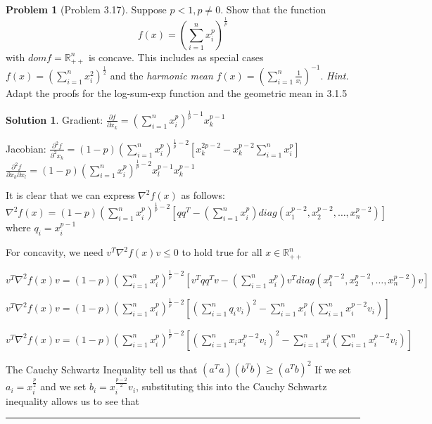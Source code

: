 \documentclass{article}
\theoremstyle{definition}
\newtheorem{problem}{Problem}
\def\fline{\rule{0.75\linewidth}{0.5pt}}
\newcommand{\finishline}{\begin{center}\fline\end{center}}
\newtheorem*{solution*}{Solution}
\newenvironment{solution}{\begin{solution*}}{{\finishline} \end{solution*}}
\begin{document}
\begin{problem} [Problem 3.17]
Suppose $p < 1, p \neq 0$. Show that the function 
\begin{equation}
    f(x) = (\sum_{i=1}^{n} x_i^p)^{\frac{1}{p}}
\end{equation}
with $dom f = \mathbb{R}^n_{++}$ is concave. This includes as special cases $f(x) = (\sum_{i=1}^{n} x_i^2)^{\frac{1}{2}}$ and the \textit{harmonic mean} $f(x) = (\sum_{i=1}^{n} \frac{1}{x_i})^{-1}$. \textit{Hint.} Adapt the proofs for the log-sum-exp
function and the geometric mean in 3.1.5

\begin{solution}
    Gradient: $\frac{\partial{f}}{\partial{x_k}} = (\sum_{i=1}^{n} x_i^p)^{\frac{1}{p} - 1} x_k^{p - 1}$

    Jacobian: \newline 
    $\frac{\partial^2{f}}{\partial^2{x_k}} = (1 - p) (\sum_{i=1}^{n} x_i^p)^{\frac{1}{p} - 2} [x_k^{2p - 2} - x_k^{p - 2} \sum_{i=1}^{n} x_i^p]$ \newline 
    $\frac{\partial^2{f}}{\partial{x_k} \partial{x_l}} = (1 - p) (\sum_{i=1}^{n} x_i^p)^{\frac{1}{p} - 2} x_l^{p - 1} x_k^{p - 1}$ \newline 

    It is clear that we can express $\nabla^2f(x)$ as follows: \newline 
    $\nabla^2f(x) = (1 - p) (\sum_{i=1}^{n} x_i^p)^{\frac{1}{p} - 2} [qq^T - (\sum_{i=1}^{n} x_i^p) diag(x_1^{p - 2}, x_2^{p - 2}, \dots, x_n^{p - 2})]$ where $q_i = x_i^{p - 1}$ \newline 

    For concavity, we need $v^T \nabla^2f(x) v \leq 0$ to hold true for all $x \in \mathbb{R}^n_{++}$

    $v^T \nabla^2f(x) v  = (1 - p) (\sum_{i=1}^{n} x_i^p)^{\frac{1}{p} - 2} [v^Tqq^Tv - (\sum_{i=1}^{n} x_i^p) v^T diag(x_1^{p - 2}, x_2^{p - 2}, \dots, x_n^{p - 2}) v]$ 

    $v^T \nabla^2f(x) v  = (1 - p) (\sum_{i=1}^{n} x_i^p)^{\frac{1}{p} - 2} [(\sum_{i=1}^{n} q_i v_i)^2 - \sum_{i=1}^{n} x_i^p (\sum_{i=1}^{n} x_i^{p - 2} v_i)]$ 

    $v^T \nabla^2f(x) v  = (1 - p) (\sum_{i=1}^{n} x_i^p)^{\frac{1}{p} - 2} [(\sum_{i=1}^{n} x_i x_i^{p - 2} v_i)^2 - \sum_{i=1}^{n} x_i^p (\sum_{i=1}^{n} x_i^{p - 2} v_i)]$ 

    The Cauchy Schwartz Inequality tell us that $(a^Ta) (b^Tb) \geq (a^Tb)^2$ \newline 
    If we set $a_i = x_i^{\frac{p}{2}}$ and we set $b_i = x_i^{\frac{p - 2}{2}} v_i$, substituting this into the Cauchy Schwartz inequality allows us to see that 


\end{solution}
\end{problem}
\end{document}
